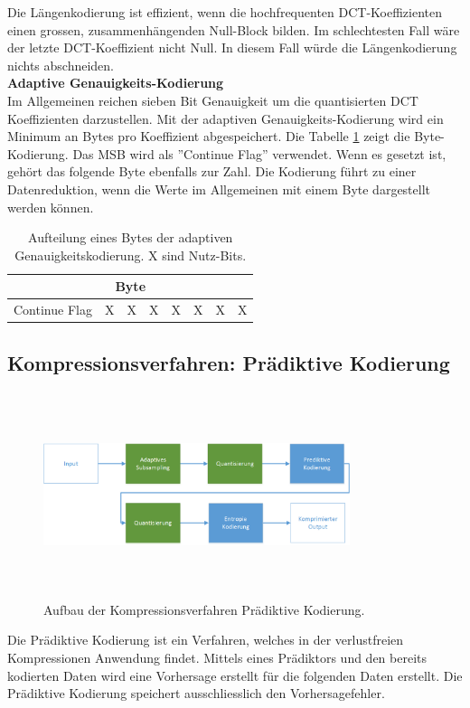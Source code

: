 Die Längenkodierung ist effizient, wenn die hochfrequenten DCT-Koeffizienten einen grossen, zusammenhängenden Null-Block bilden. Im schlechtesten Fall wäre der letzte DCT-Koeffizient nicht Null. In diesem Fall würde die Längenkodierung nichts abschneiden.\\

\textbf{Adaptive Genauigkeits-Kodierung}\\
Im Allgemeinen reichen sieben Bit Genauigkeit um die quantisierten DCT Koeffizienten darzustellen. Mit der adaptiven Genauigkeits-Kodierung wird ein Minimum an Bytes pro Koeffizient abgespeichert. Die Tabelle \ref{konzept:loesung1:entropie:adaptive} zeigt die Byte-Kodierung. Das MSB wird als ''Continue Flag'' verwendet. Wenn es gesetzt ist, gehört das folgende Byte ebenfalls zur Zahl. Die Kodierung führt zu einer Datenreduktion, wenn die Werte im Allgemeinen mit einem Byte dargestellt werden können.

\begin{table}[!htbp]
	\center
	\begin{tabular}{|c|c|c|c||c|c|c|c|}
	\hline
	\multicolumn{8}{|c|}{Byte}\\\hline
	Continue Flag & X & X & X & X & X & X & X \\\hline
	\end{tabular}
	\caption{Aufteilung eines Bytes der adaptiven Genauigkeitskodierung. X sind Nutz-Bits.}
	\label{konzept:loesung1:entropie:adaptive}
\end{table}
\pagebreak

\subsection{Kompressionsverfahren: Prädiktive Kodierung} \label{konzept:prediktiv}
\begin{figure}[!htbp]
	\center
	\includegraphics[width=0.8\textwidth,height=6cm,keepaspectratio]{./pictures/konzept/solution2/aufbau.png}
	\caption{Aufbau der Kompressionsverfahren Prädiktive Kodierung.}
	\label{konzept:loesung2:aufbau}
\end{figure}
Die Prädiktive Kodierung ist ein Verfahren, welches in der verlustfreien Kompressionen Anwendung findet. Mittels eines Prädiktors und den bereits kodierten Daten wird eine Vorhersage erstellt für die folgenden Daten erstellt. Die Prädiktive Kodierung speichert ausschliesslich den Vorhersagefehler.

